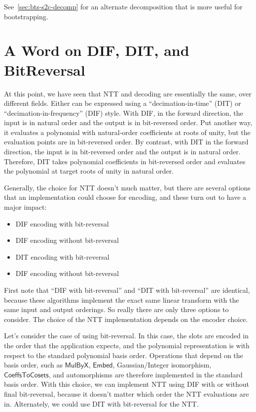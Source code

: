 \documentclass[../fheimpl.tex]{subfiles}
\begin{document}
    See~\cref{sec:bts-s2c-decomp} for an alternate decomposition that is more useful for bootstrapping.

\section{A Word on DIF, DIT, and BitReversal}
At this point, we have seen that NTT and decoding are essentially the same, over different fields. Either can be expressed using a ``decimation-in-time'' (DIT) or ``decimation-in-frequency'' (DIF) style. With DIF, in the forward direction, the input is in natural order and the output is in bit-reversed order. Put another way, it evaluates a polynomial with natural-order coefficients at roots of unity, but the evaluation points are in bit-reversed order. By contrast, with DIT in the forward direction, the input is in bit-reversed order and the output is in natural order. Therefore, DIT takes polynomial coefficients in bit-reversed order and evaluates the polynomial at target roots of unity in natural order.

Generally, the choice for NTT doesn't much matter, but there are several options that an implementation could choose for encoding, and these turn out to have a major impact:
\begin{itemize}
	\item DIF encoding with bit-reversal
	\item DIF encoding without bit-reversal
	\item DIT encoding with bit-reversal
	\item DIF encoding without bit-reversal
\end{itemize}
First note that ``DIF with bit-reversal'' and ``DIT with bit-reversal'' are identical, because these algorithms implement the exact same linear transform with the same input and output orderings. So really there are only three options to consider. The choice of the NTT implementation depends on the encoder choice.

Let's consider the case of using bit-reversal. In this case, the slots are encoded in the order that the application expects, and the polynomial representation is with respect to the standard polynomial basis order. Operations that depend on the basis order, such as $\mathsf{MulByX}$, $\mathsf{Embed}$, Gaussian/Integer isomorphism, $\mathsf{CoeffsToCosets}$, and automorphisms are therefore implemented in the standard basis order. With this choice, we can implement NTT using DIF with or without final bit-reversal, because it doesn't matter which order the NTT evaluations are in. Alternately, we could use DIT with bit-reversal for the NTT.
\end{document}
